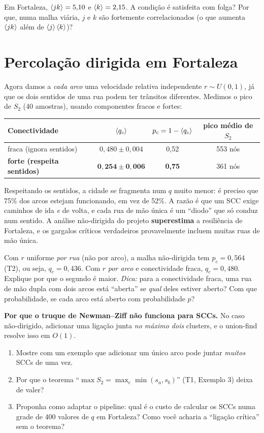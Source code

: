 \documentclass[11pt]{article}
\begin{document}
 Em Fortaleza, $\left\langle jk \right\rangle = 5{,}10$ e $\left\langle k \right\rangle = 2{,}15$. A condição é satisfeita com folga? Por que, numa malha viária, $j$ e $k$ são fortemente correlacionados (o que aumenta $\left\langle jk \right\rangle$ além de $\left\langle j \right\rangle\left\langle k \right\rangle$)?

\section{Percolação dirigida em Fortaleza}

Agora damos a \emph{cada arco} uma velocidade relativa independente $r\sim U(0,1)$, já que os dois sentidos de uma rua podem ter trânsitos diferentes. Medimos o pico de $S_2$ (40 amostras), usando componentes fracos e fortes:
\begin{center}
\begin{tabular}{lccc}
\toprule
Conectividade & $\left\langle q_c \right\rangle$ & $p_c = 1-\left\langle q_c \right\rangle$ & pico médio de $S_2$\\
\midrule
fraca (ignora sentidos) & $0{,}480\pm0{,}004$ & 0,52 & 553 nós\\
\textbf{forte (respeita sentidos)} & $\bm{0{,}254\pm0{,}006}$ & \textbf{0,75} & 361 nós\\
\bottomrule
\end{tabular}
\end{center}

\begin{ideia}
Respeitando os sentidos, a cidade se fragmenta num $q$ muito menor: é preciso que 75\% dos arcos estejam funcionando, em vez de 52\%. A razão é que um SCC exige caminhos de ida \emph{e} de volta, e cada rua de mão única é um ``diodo'' que só conduz num sentido. A análise não-dirigida do projeto \textbf{superestima} a resiliência de Fortaleza, e os gargalos críticos verdadeiros provavelmente incluem muitas ruas de mão única.
\end{ideia}

 Com $r$ uniforme \emph{por rua} (não por arco), a malha não-dirigida tem $p_c = 0{,}564$ (T2), ou seja, $q_c = 0{,}436$. Com $r$ \emph{por arco} e conectividade fraca, $q_c = 0{,}480$. Explique por que o segundo é maior. \emph{Dica:} para a conectividade fraca, uma rua de mão dupla com dois arcos está ``aberta'' se \emph{qual} deles estiver aberto? Com que probabilidade, se cada arco está aberto com probabilidade $p$?

 \textbf{Por que o truque de Newman--Ziff não funciona para SCCs.} No caso não-dirigido, adicionar uma ligação junta \emph{no máximo dois} clusters, e o union-find resolve isso em $O(1)$.
\begin{enumerate}
  \item Mostre com um exemplo que adicionar um único arco pode juntar \emph{muitos} SCCs de uma vez.
  \item Por que o teorema ``$\max S_2 = \max_e\min(s_a,s_b)$'' (T1, Exemplo 3) deixa de valer?
  \item Proponha como adaptar o pipeline: qual é o custo de calcular os SCCs numa grade de 400 valores de $q$ em Fortaleza? Como você acharia a ``ligação crítica'' sem o teorema?
\end{enumerate}
\end{document}
